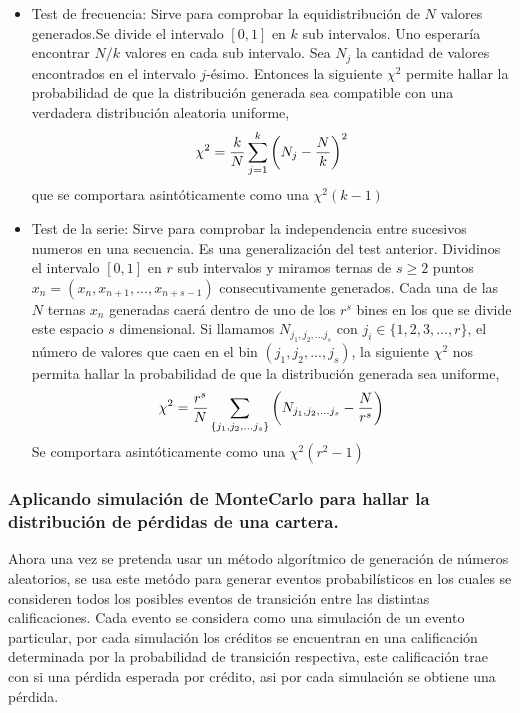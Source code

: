 \documentclass[
  12pt,
]{krantz}
\theoremstyle{definition}
\theoremstyle{definition}
\theoremstyle{definition}
\theoremstyle{remark}
\begin{document}
\begin{itemize}
\item
  Test de frecuencia: Sirve para comprobar la equidistribución de \(N\) valores generados.Se divide el intervalo \([0,1]\) en \(k\) sub intervalos. Uno esperaría encontrar \(N/k\) valores en cada sub intervalo. Sea \(N_j\) la cantidad de valores encontrados en el intervalo \(j\)-ésimo. Entonces la siguiente \(\chi^2\) permite hallar la probabilidad de que la distribución generada sea compatible con una verdadera distribución aleatoria uniforme,\[\chi^2=\frac{k}{N}\sum_{j=1}^k\bigg{(}N_j-\frac{N}{k}\bigg{)}^2\] que se comportara asintóticamente como una \(\chi^2(k-1)\)
\item
  Test de la serie: Sirve para comprobar la independencia entre sucesivos numeros en una secuencia. Es una generalización del test anterior. Dividinos el intervalo \([0,1]\) en \(r\) sub intervalos y miramos ternas de \(s\geq2\) puntos \(x_n=(x_n,x_{n+1},...,x_{n+s-1})\) consecutivamente generados. Cada una de las \(N\) ternas \(x_n\) generadas caerá dentro de uno de los \(r^s\) bines en los que se divide este espacio \(s\) dimensional. Si llamamos \(N_{j_1,j_2,...j_s}\) con \(j_i\in\{1,2,3,...,r\}\), el número de valores que caen en el bin \((j_1,j_2,...,j_s)\), la siguiente \(\chi^2\) nos permita hallar la probabilidad de que la distribución generada sea uniforme, \[\chi^2=\frac{r^s}{N}\sum_{\{j_1,j_2,...j_s\}}\bigg{(}N_{j_1,j_2,...j_s}-\frac{N}{r^s}\bigg{)}\] Se comportara asintóticamente como una \(\chi^2(r^2-1)\)
\end{itemize}

\hypertarget{aplicando-simulacion-de-montecarlo-para-hallar-la-distribucion-de-perdidas-de-una-cartera.}{%
\subsubsection{Aplicando simulación de MonteCarlo para hallar la distribución de pérdidas de una cartera.}\label{aplicando-simulacion-de-montecarlo-para-hallar-la-distribucion-de-perdidas-de-una-cartera.}}

Ahora una vez se pretenda usar un método algorítmico de generación de números aleatorios, se usa este metódo para generar eventos probabilísticos en los cuales se consideren todos los posibles eventos de transición entre las distintas calificaciones. Cada evento se considera como una simulación de un evento particular, por cada simulación los créditos se encuentran en una calificación determinada por la probabilidad de transición respectiva, este calificación trae con si una pérdida esperada por crédito, asi por cada simulación se obtiene una pérdida.
\end{document}
